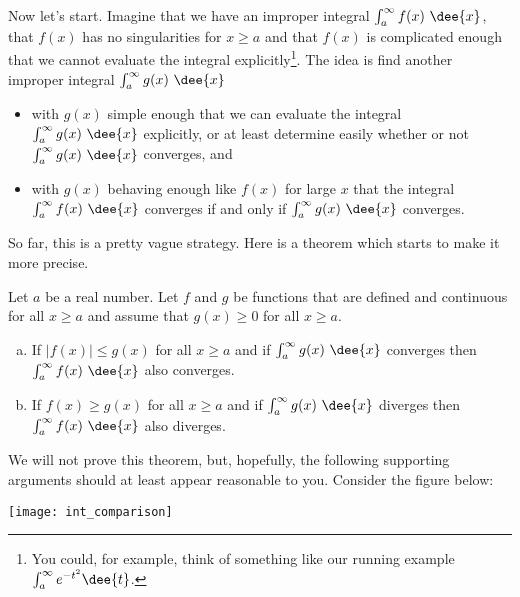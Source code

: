 Now let's start. Imagine that we have an improper integral
$\int_a^\infty f(x)\ \dee{x}$, that $f(x)$ has no singularities for $x\ge a$
and that $f(x)$ is complicated enough that we cannot evaluate the
integral explicitly\footnote{You could, for example, think of something like
our running example $\int_a^\infty e^{-t^2}\dee{t}$.}. The idea is find another
improper integral $\int_a^\infty g(x)\ \dee{x}$
\begin{itemize}
\item with $g(x)$ simple enough that we can evaluate the integral
$\int_a^\infty g(x)\ \dee{x}$ explicitly, or at least determine easily
whether or not $\int_a^\infty g(x)\ \dee{x}$ converges, and
\item with $g(x)$ behaving enough like $f(x)$ for large $x$
that the integral $\int_a^\infty f(x)\ \dee{x}$ converges if and only if
$\int_a^\infty g(x)\ \dee{x}$ converges.
\end{itemize}
So far, this is a pretty vague strategy. Here is a theorem
which starts to make it more precise.


\begin{theorem}[Comparison]\label{thm:IMPcomparison}
Let $a$ be a real number. Let $f$ and $g$ be functions that are
defined and continuous for all $x\ge a$ and assume that  $g(x)\ge 0$
for all  $x\ge a$.
\begin{enumerate}[(a)]
\item If $|f(x)|\le g(x)$ for all $x\ge a$ and if $\int_a^\infty g(x)\ \dee{x}$
  converges then $\int_a^\infty f(x)\ \dee{x}$ also converges.
\item If $f(x)\ge g(x)$ for all $x\ge a$ and if $\int_a^\infty g(x)\ \dee{x}$
 diverges then $\int_a^\infty f(x)\ \dee{x}$ also diverges.
\end{enumerate}
\end{theorem}


We will not prove this theorem, but, hopefully, the following supporting
arguments should at least appear reasonable to you. Consider the figure below:
\begin{efig}
 \centering
\texttt{[image: int\_comparison]}
\end{efig}

